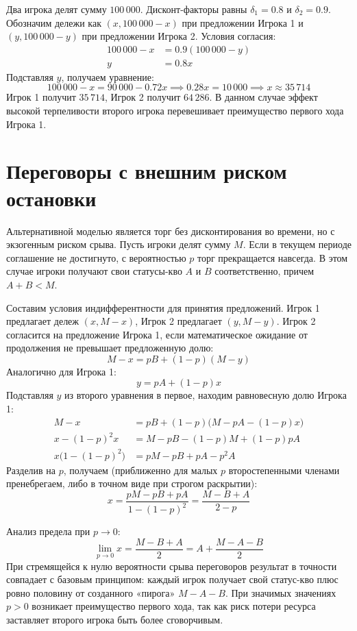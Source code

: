 \begin{example}
Два игрока делят сумму $100\,000$. Дисконт-факторы равны $\delta_1 = 0.8$ и $\delta_2 = 0.9$. 
Обозначим дележи как $(x, 100\,000 - x)$ при предложении Игрока 1 и $(y, 100\,000 - y)$ при предложении Игрока 2.
Условия согласия:
\begin{align*}
    100\,000 - x &= 0.9(100\,000 - y) \\
    y &= 0.8x
\end{align*}
Подставляя $y$, получаем уравнение:
\[
    100\,000 - x = 90\,000 - 0.72x \implies 0.28x = 10\,000 \implies x \approx 35\,714
\]
Игрок 1 получит $35\,714$, Игрок 2 получит $64\,286$. В данном случае эффект высокой терпеливости второго игрока перевешивает преимущество первого хода Игрока 1.
\end{example}

\section{Переговоры с внешним риском остановки}

Альтернативной моделью является торг без дисконтирования во времени, но с экзогенным риском срыва. Пусть игроки делят сумму $M$. Если в текущем периоде соглашение не достигнуто, с вероятностью $p$ торг прекращается навсегда. В этом случае игроки получают свои статусы-кво $A$ и $B$ соответственно, причем $A + B < M$.

Составим условия индифферентности для принятия предложений. Игрок 1 предлагает дележ $(x, M-x)$, Игрок 2 предлагает $(y, M-y)$.
Игрок 2 согласится на предложение Игрока 1, если математическое ожидание от продолжения не превышает предложенную долю:
\begin{equation}
    M - x = p B + (1 - p)(M - y)
\end{equation}
Аналогично для Игрока 1:
\begin{equation}
    y = p A + (1 - p)x
\end{equation}
Подставляя $y$ из второго уравнения в первое, находим равновесную долю Игрока 1:
\begin{align*}
    M - x &= p B + (1 - p)\big(M - p A - (1 - p)x\big) \\
    x - (1 - p)^2 x &= M - p B - (1 - p)M + (1 - p)p A \\
    x \big(1 - (1 - p)^2\big) &= p M - p B + p A - p^2 A
\end{align*}
Разделив на $p$, получаем (приближенно для малых $p$ второстепенными членами пренебрегаем, либо в точном виде при строгом раскрытии):
\begin{equation}
    x = \frac{p M - p B + p A}{1 - (1 - p)^2} = \frac{M - B + A}{2 - p}
\end{equation}

Анализ предела при $p \to 0$:
\[
    \lim_{p \to 0} x = \frac{M - B + A}{2} = A + \frac{M - A - B}{2}
\]
При стремящейся к нулю вероятности срыва переговоров результат в точности совпадает с базовым принципом: каждый игрок получает свой статус-кво плюс ровно половину от созданного «пирога» $M - A - B$. При значимых значениях $p > 0$ возникает преимущество первого хода, так как риск потери ресурса заставляет второго игрока быть более сговорчивым.
